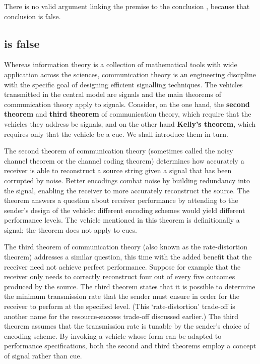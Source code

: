 \documentclass[12pt]{article}
\begin{document}
\noindent There is no valid argument linking the premise \ami{} to the conclusion \act{}, because that conclusion is false.

\subsection{\act{} is false}\label{subsec:actFalse}

Whereas information theory is a collection of mathematical tools with wide application across the sciences, communication theory is an engineering discipline with the specific goal of designing efficient signalling techniques.
The vehicles transmitted in the central model are signals and the main theorems of communication theory apply to signals.
Consider, on the one hand, the \textbf{second theorem} and \textbf{third theorem} of communication theory, which require that the vehicles they address be signals, and on the other hand \textbf{Kelly's theorem}, which requires only that the vehicle be a cue.
We shall introduce them in turn.

The second theorem of communication theory (sometimes called the noisy channel theorem or the channel coding theorem) determines how accurately a receiver is able to reconstruct a source string given a signal that has been corrupted by noise.
Better encodings combat noise by building redundancy into the signal, enabling the receiver to more accurately reconstruct the source.
The theorem answers a question about receiver performance by attending to the sender's design of the vehicle: different encoding schemes would yield different performance levels.
The vehicle mentioned in this theorem is definitionally a signal; the theorem does not apply to cues.

The third theorem of communication theory (also known as the rate-distortion theorem) addresses a similar question, this time with the added benefit that the receiver need not achieve perfect performance.
Suppose for example that the receiver only needs to correctly reconstruct four out of every five outcomes produced by the source.
The third theorem states that it is possible to determine the minimum transmission rate that the sender must ensure in order for the receiver to perform at the specified level.
(This `rate-distortion' trade-off is another name for the resource-success trade-off discussed earlier.)
The third theorem assumes that the transmission rate is tunable by the sender's choice of encoding scheme.
By invoking a vehicle whose form can be adapted to performance specifications, both the second and third theorems employ a concept of signal rather than cue.
\end{document}
